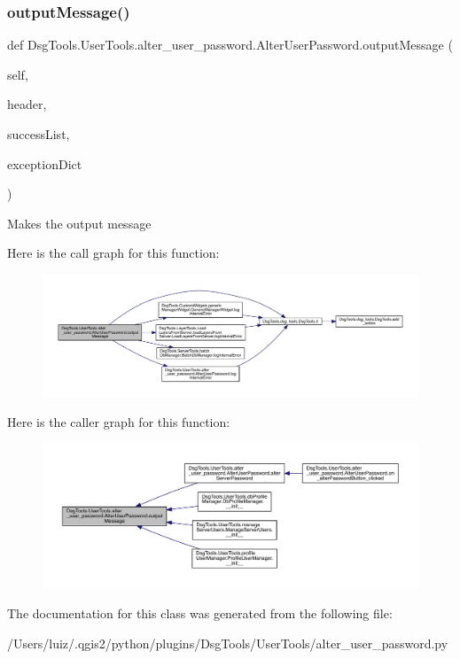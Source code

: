 \subsubsection{\texorpdfstring{output\+Message()}{outputMessage()}}
{\footnotesize\ttfamily def Dsg\+Tools.\+User\+Tools.\+alter\+\_\+user\+\_\+password.\+Alter\+User\+Password.\+output\+Message (\begin{DoxyParamCaption}\item[{}]{self,  }\item[{}]{header,  }\item[{}]{success\+List,  }\item[{}]{exception\+Dict }\end{DoxyParamCaption})}

\begin{DoxyVerb}Makes the output message
\end{DoxyVerb}
 Here is the call graph for this function\+:
\nopagebreak
\begin{figure}[H]
\begin{center}
\leavevmode
\includegraphics[width=350pt]{class_dsg_tools_1_1_user_tools_1_1alter__user__password_1_1_alter_user_password_a16698954a9899247fd714679b28f62e6_cgraph}
\end{center}
\end{figure}
Here is the caller graph for this function\+:
\nopagebreak
\begin{figure}[H]
\begin{center}
\leavevmode
\includegraphics[width=350pt]{class_dsg_tools_1_1_user_tools_1_1alter__user__password_1_1_alter_user_password_a16698954a9899247fd714679b28f62e6_icgraph}
\end{center}
\end{figure}


The documentation for this class was generated from the following file\+:\begin{DoxyCompactItemize}
\item 
/\+Users/luiz/.\+qgis2/python/plugins/\+Dsg\+Tools/\+User\+Tools/alter\+\_\+user\+\_\+password.\+py\end{DoxyCompactItemize}
